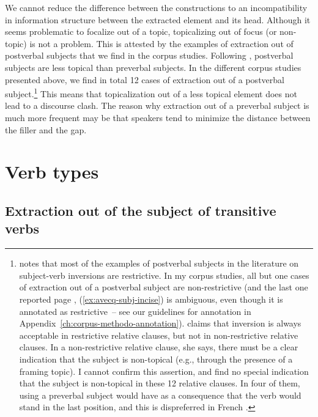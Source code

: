 We cannot reduce the difference between the constructions to an incompatibility in information structure between the extracted element and its head. Although it seems problematic to focalize out of a topic, topicalizing out of focus (or non-topic) is not a problem. This is attested by the examples of extraction out of postverbal subjects that we find in the corpus studies. Following \citet{Lahousse.2011}, postverbal subjects are less topical than preverbal subjects. In the different corpus studies presented above, we find in total 12 cases of extraction out of a postverbal subject.\footnote{\citet[261]{Lahousse.2011} notes that most of the examples of postverbal subjects in the literature on subject-verb inversions are restrictive. In my corpus studies, all but one cases of extraction out of a postverbal subject are non-restrictive (and the last one reported page \pageref{ex:avecq-subj-incise}, (\ref{ex:avecq-subj-incise}) is ambiguous, even though it is annotated as restrictive~-- see our guidelines for annotation in Appendix~\ref{ch:corpus-methodo-annotation}). \citeauthor{Lahousse.2011} claims that inversion is always acceptable in restrictive relative clauses, but not in non-restrictive relative clauses. In a non-restrictive relative clause, she says, there must be a clear indication that the subject is non-topical (e.g., through the presence of a framing topic). I cannot confirm this assertion, and find no special indication that the subject is non-topical in these 12 relative clauses. In four of them, using a preverbal subject would have as a consequence that the verb would stand in the last position, and this is dispreferred in French \citep[still following][261]{Lahousse.2011}.} This means that topicalization out of a less topical element does not lead to a discourse clash. The reason why extraction out of a preverbal subject is much more frequent may be that speakers tend to minimize the distance between the filler and the gap. 

\section{Verb types}

\subsection{Extraction out of the subject of transitive verbs}

